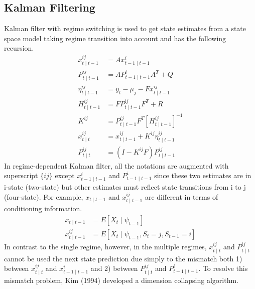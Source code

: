 \documentclass[UTF8,12pt]{ctexart}
\numberwithin{equation}{section}%
\begin{document}
	\subsection{Kalman Filtering}
	Kalman filter with regime switching is used to get state estimates from a state space model taking regime transition into account and has the following recursion.
	$$
	\begin{aligned}
		x_{t \mid t-1}^{i j} & =A x_{t-1 \mid t-1}^i \\
		P_{t \mid t-1}^{i j} & =A P_{t-1 \mid t-1}^i A^T+Q \\
		\eta_{t \mid t-1}^{i j} & =y_t-\mu_j-F x_{t \mid t-1}^{i j} \\
		H_{t \mid t-1}^{i j} & =F P_{t \mid t-1}^{i j} F^T+R \\
		K^{i j} & =P_{t \mid t-1}^{i j} F^T\left[H_{t \mid t-1}^{i j}\right]^{-1} \\
		x_{t \mid t}^{i j} & =x_{t \mid t-1}^{i j}+K^{i j} \eta_{t \mid t-1}^{i j} \\
		P_{t \mid t}^{i j} & =\left(I-K^{i j} F\right) P_{t \mid t-1}^{i j}
	\end{aligned}
	$$
	In regime-dependent Kalman filter, all the notations are augmented with superscript $\{i j\}$ except $x_{t-1 \mid t-1}^i$ and $P_{t-1 \mid t-1}^i$ since these two estimates are in i-state (two-state) but other estimates must reflect state transitions from i to $\mathrm{j}$ (four-state). For example, $x_{t \mid t-1}$ and $x_{t \mid t-1}^{i j}$ are different in terms of conditioning information.
	$$
	\begin{aligned}
		x_{t \mid t-1} & =E\left[X_t \mid \psi_{t-1}\right] \\
		x_{t \mid t-1}^{i j} & =E\left[X_t \mid \psi_{t-1}, S_t=j, S_{t-1}=i\right]
	\end{aligned}
	$$
	In contrast to the single regime, however, in the multiple regimes, $x_{t \mid t}^{i j}$ and $P_{t \mid t}^{i j}$ cannot be used the next state prediction due simply to the mismatch both 1) between $x_{t \mid t}^{i j}$ and $x_{t-1 \mid t-1}^i$ and 2) between $P_{t \mid t}^{i j}$ and $P_{t-1 \mid t-1}^i$. To resolve this mismatch problem, Kim (1994) developed a dimension collapsing algorithm.
	
\end{document}
